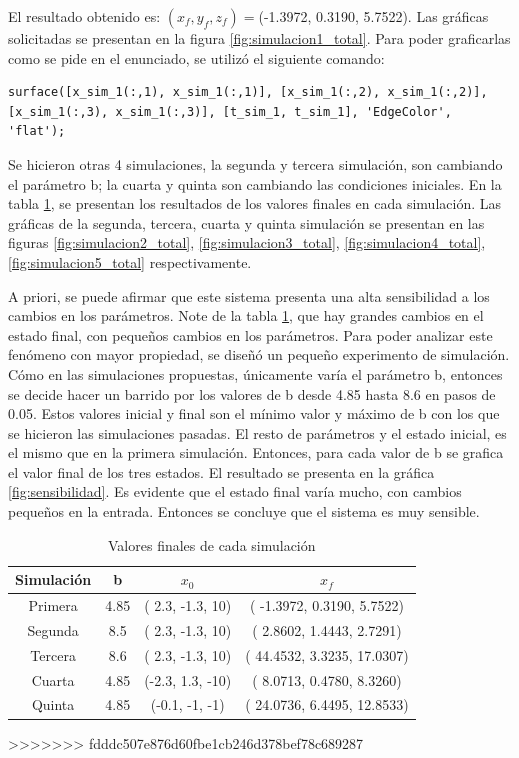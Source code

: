 \documentclass[12pt,letterpaper]{article}
\begin{document}
El resultado obtenido es: $(x_f, y_f, z_f)=$(-1.3972, 0.3190, 5.7522).
Las gráficas solicitadas se presentan en la figura \ref{fig:simulacion1_total}. Para poder graficarlas como se pide en el enunciado, se utilizó el siguiente comando:

\begin{lstlisting}[style=Matlab-editor, basicstyle=\mlttfamily]
    surface([x_sim_1(:,1), x_sim_1(:,1)], [x_sim_1(:,2), x_sim_1(:,2)], [x_sim_1(:,3), x_sim_1(:,3)], [t_sim_1, t_sim_1], 'EdgeColor', 'flat');
\end{lstlisting}

Se hicieron otras 4 simulaciones, la segunda y tercera simulación, son cambiando el parámetro b; la cuarta y quinta son cambiando las condiciones iniciales. En la tabla \ref{table:finales_ejercicio_1}, se presentan los resultados de los valores finales en cada simulación. Las gráficas de la segunda, tercera, cuarta y quinta simulación se presentan en las figuras \ref{fig:simulacion2_total}, \ref{fig:simulacion3_total}, \ref{fig:simulacion4_total}, \ref{fig:simulacion5_total} respectivamente. 

A priori, se puede afirmar que este sistema presenta una alta sensibilidad a los cambios en los parámetros. Note de la tabla \ref{table:finales_ejercicio_1}, que hay grandes cambios en el estado final, con pequeños cambios en los parámetros. Para poder analizar este fenómeno con mayor propiedad, se diseñó un pequeño experimento de simulación. Cómo en las simulaciones propuestas, únicamente varía el parámetro b, entonces se decide hacer un barrido por los valores de b desde 4.85 hasta 8.6 en pasos de 0.05. Estos valores inicial y final son el mínimo valor y máximo de b con los que se hicieron las simulaciones pasadas. El resto de parámetros y el estado inicial, es el mismo que en la primera simulación. Entonces, para cada valor de b se grafica el valor final de los tres estados. El resultado se presenta en la gráfica \ref{fig:sensibilidad}. Es evidente que el estado final varía mucho, con cambios pequeños en la entrada. Entonces se concluye que el sistema es muy sensible.

 




\begin{table}
\caption{Valores finales de cada simulación}
\label{table:finales_ejercicio_1}
\centering
\begin{tabular}{| c | c  c  c|}
  \hline
 Simulación & b   & $x_0$   & $x_f$   \\
 \hline
 Primera    & 4.85&( 2.3, -1.3,  10) &( -1.3972, 0.3190, 5.7522) \\
 Segunda    & 8.5& ( 2.3, -1.3,  10) &( 2.8602,  1.4443, 2.7291) \\
 Tercera    & 8.6& ( 2.3, -1.3,  10) &( 44.4532, 3.3235, 17.0307)\\
 Cuarta     & 4.85&(-2.3,  1.3, -10) &( 8.0713,  0.4780, 8.3260)\\
 Quinta     & 4.85&(-0.1, -1,    -1) &( 24.0736, 6.4495, 12.8533)\\
 \hline

\end{tabular}
\end{table}
>>>>>>> fdddc507e876d60fbe1cb246d378bef78c689287
\end{document}
